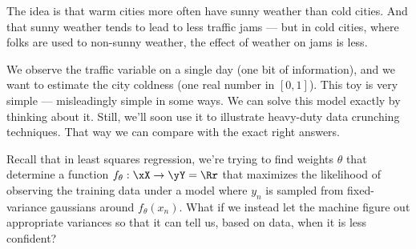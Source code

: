 The idea is that warm cities more often have sunny weather than cold cities.
And that sunny weather tends to lead to less traffic jams ---
but in cold cities, where folks are used to non-sunny weather, the effect
of weather on jams is less.


We observe the traffic variable on a single day (one bit of information), and
we want to estimate the city coldness (one real number in $[0,1]$).  This toy
is very simple --- misleadingly simple in some ways.
%
We can solve this model exactly by thinking about it.
Still, we'll soon use it
to illustrate heavy-duty data crunching techniques.  That way we can compare
with the exact right answers.




%
Recall that in least squares regression, we're trying to find weights $\theta$
that determine a function $f_\theta:\xX\to \yY=\Rr$ that maximizes the
likelihood of observing the training data under a model where $y_n$ is sampled
from fixed-variance gaussians around $f_\theta(x_n)$.  What if we instead
let the machine figure out appropriate variances so that it can tell us, based
on data, when it is less confident?


